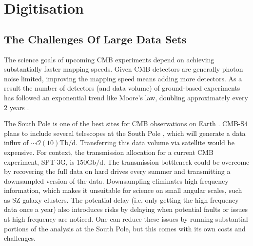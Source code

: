 \documentclass[apj]{emulateapj}
\begin{document}






\section{Digitisation}
\label{sec:dig}

\subsection{The Challenges Of Large Data Sets}
\label{subsec:problem}


The science goals of upcoming CMB experiments depend on achieving substantially faster mapping speeds. Given CMB detectors are generally photon noise limited, improving the mapping speed means adding more detectors. As a result the number of detectors (and data volume) of ground-based experiments has followed an exponential trend like Moore's law, doubling approximately every 2 years \citep{s4sciencebook, Abazajian2015}.

The South Pole is one of the best sites for CMB observations on Earth \citep{chamberlin2001, spt2004}. CMB-S4 plans to include several telescopes at the South Pole \citep{s4sciencebook, barron2018}, which will generate a data influx of $\sim\mathcal{O}(10)\mathrm{Tb/d}$. Transferring this data volume via satellite would be expensive. For context, the transmission allocation for a current CMB experiment, SPT-3G, is $150\mathrm{Gb/d}$. The transmission bottleneck could be overcome by recovering the full data on hard drives every summer and transmitting a downsampled version of the data. Downsampling eliminates high frequency information, which makes it unsuitable for science on small angular scales, such as SZ galaxy clusters. The potential delay (i.e. only getting the high frequency data once a year) also introduces risks by delaying when potential faults or issues at high frequency are noticed. One can reduce these issues by running substantial portions of the analysis at the South Pole, but this comes with its own costs and challenges.
\end{document}
